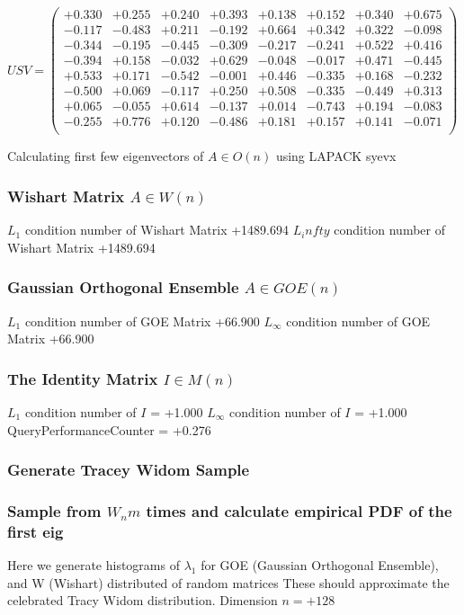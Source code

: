 \documentclass[9pt]{article}
\theoremstyle{plain}
\theoremstyle{definition}
\theoremstyle{remark}
\numberwithin{equation}{section}
\begin{document}
$U S V = \left(
\begin{array}{
cccccccc}
+0.330 & +0.255 & +0.240 & +0.393 & +0.138 & +0.152 & +0.340 & +0.675 \\
-0.117 & -0.483 & +0.211 & -0.192 & +0.664 & +0.342 & +0.322 & -0.098 \\
-0.344 & -0.195 & -0.445 & -0.309 & -0.217 & -0.241 & +0.522 & +0.416 \\
-0.394 & +0.158 & -0.032 & +0.629 & -0.048 & -0.017 & +0.471 & -0.445 \\
+0.533 & +0.171 & -0.542 & -0.001 & +0.446 & -0.335 & +0.168 & -0.232 \\
-0.500 & +0.069 & -0.117 & +0.250 & +0.508 & -0.335 & -0.449 & +0.313 \\
+0.065 & -0.055 & +0.614 & -0.137 & +0.014 & -0.743 & +0.194 & -0.083 \\
-0.255 & +0.776 & +0.120 & -0.486 & +0.181 & +0.157 & +0.141 & -0.071 \\
\end{array}
\right)$ \newline 

Calculating first few eigenvectors of $A \in O(n)$ using LAPACK syevx

\subsubsection{Wishart Matrix $A \in W(n)$}
$L_1$ condition number of Wishart Matrix +1489.694
$L_infty$ condition number of Wishart Matrix +1489.694
\subsubsection{Gaussian Orthogonal Ensemble $A \in GOE(n)$}
$L_1$ condition number of GOE Matrix +66.900
$L_\infty$ condition number of GOE Matrix +66.900
\subsubsection{The Identity Matrix $I \in M(n)$}
$L_1$ condition number of $I$ = +1.000
$L_\infty$ condition number of $I$ = +1.000
QueryPerformanceCounter  =  +0.276
\subsubsection{Generate Tracey Widom Sample}
\subsubsection{Sample from $W_n m$ times and calculate empirical PDF of the first eig}
Here we generate histograms of $\lambda_1$ for GOE (Gaussian Orthogonal Ensemble), and W (Wishart) 		 distributed of random matrices
These should approximate the celebrated Tracy Widom distribution.
Dimension $n = +128$
\end{document}

